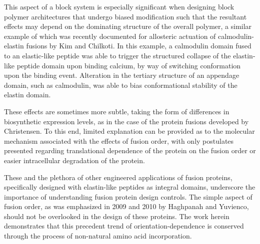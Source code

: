 \begin{refsection}
This aspect of a block system is
especially significant when designing block polymer architectures that undergo
biased modification such that the resultant effects may depend on the dominating
structure of the overall polymer, a similar example of which was recently
documented for allosteric actuation of calmodulin-elastin fusions by Kim and
Chilkoti.\cite{Kim2008a} In this example, a calmodulin domain fused to an
elastic-like peptide was able to trigger the structured collapse of the
elastin-like peptide domain upon binding calcium, by way of switching
conformation upon the binding event. Alteration in the tertiary structure of an
appendage domain, such as calmodulin, was able to bias conformational stability
of the elastin domain.

These effects are sometimes more subtle, taking the
form of differences in biosynthetic expression levels, as in the case of the
protein fusions developed by Christensen.\cite{Christensen2009} To this end,
limited explanation can be provided as to the molecular mechanism associated
with the effects of fusion order, with only postulates presented regarding
translational dependence of the protein on the fusion order or easier
intracellular degradation of the protein.

These and the plethora of other engineered applications of fusion proteins,
specifically designed with elastin-like peptides as integral domains, underscore
the importance of understanding fusion protein design controls. The simple
aspect of fusion order, as was emphasized in 2009 and 2010 by Haghpanah and
Yuvienco,\cite{Haghpanah2009,Haghpanah2010} should not be overlooked in the
design of these proteins. The work herein demonstrates that this precedent trend
of orientation-dependence is conserved through the process of non-natural amino
acid incorporation.


\end{refsection}
